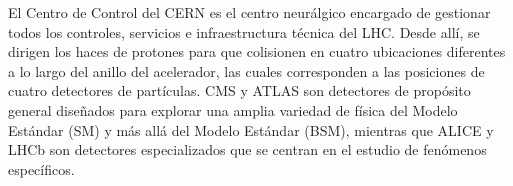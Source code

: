 El Centro de Control del CERN es el centro neurálgico encargado de gestionar todos los controles, servicios e infraestructura técnica del LHC. Desde allí, se dirigen los haces de protones para que colisionen en cuatro ubicaciones diferentes a lo largo del anillo del acelerador, las cuales corresponden a las posiciones de cuatro detectores de partículas. CMS y ATLAS son detectores de propósito general diseñados para explorar una amplia variedad de física del Modelo Estándar (SM) y más allá del Modelo Estándar (BSM), mientras que ALICE y LHCb son detectores especializados que se centran en el estudio de fenómenos específicos.

